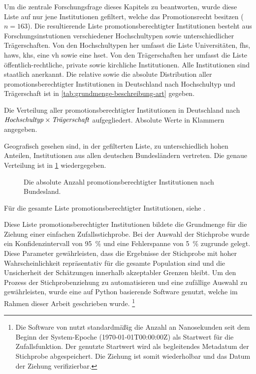 Um die zentrale Forschungsfrage dieses Kapitels zu beantworten, wurde diese Liste auf nur jene Institutionen gefiltert, welche das Promotionsrecht besitzen ($n=163$).
Die resultierende Liste promotionsberechtigter Institutionen besteht aus Forschungsinstutionen verschiedener Hochschultypen sowie unterschiedlicher Trägerschaften.
Von den Hochschultypen her umfasst die Liste Universitäten, \glspl{fh}, \glspl{haw}, \glspl{kh}, eine \gls{vh} sowie eine \gls{hset}.
Von den Trägerschaften her umfasst die Liste öffentlich-rechtliche, private sowie kirchliche Institutionen. Alle Institutionen sind staatlich anerkannt.
Die relative sowie die absolute Distribution aller promotionsberechtigter Institutionen in Deutschland nach Hochschultyp und Trägerschaft ist in \cref{tab:grundmenge-beschreibung-art} gegeben.
\begin{table}[!htbp]
	\caption{Die Verteilung aller promotionsberechtigter Institutionen in Deutschland nach $\text{\textit{Hochschultyp}}\times\text{\textit{Trägerschaft}}$ aufgegliedert. Absolute Werte in Klammern angegeben.}
    
	\label{tab:grundmenge-beschreibung-art}
\end{table}

\noindent Geografisch gesehen sind, in der gefilterten Liste, zu unterschiedlich hohen Anteilen, Institutionen aus allen deutschen Bundesländern vertreten.
Die genaue Verteilung ist in \cref{fig:DE-grundmenge-beschreibung} wiedergegeben.
\begin{figure}[!htbp]
    \centering
    
    \caption{Die absolute Anzahl promotionsberechtigter Institutionen nach Bundesland.}
    \label{fig:DE-grundmenge-beschreibung}
\end{figure}

\noindent Für die gesamte Liste promotionsberechtigter Institutionen, siehe .

Diese Liste promotionsberechtigter Institutionen bildete die Grundmenge für die Ziehung einer einfachen Zufallsstichprobe.
Bei der Auswahl der Stichprobe wurde ein Konfidenzintervall von \SI{95}{\percent} und eine Fehlerspanne von \SI{5}{\percent} zugrunde gelegt.
Diese Parameter gewährleisten, dass die Ergebnisse der Stichprobe mit hoher Wahrscheinlichkeit repräsentativ für die gesamte Population sind und die Unsicherheit der Schätzungen innerhalb akzeptabler Grenzen bleibt.
Um den Prozess der Stichprobenziehung zu automatisieren und eine zufällige Auswahl zu gewährleisten, wurde eine auf Python basierende Software \autocite{Krassnig2024-csv} genutzt, welche im Rahmen dieser Arbeit geschrieben wurde.%
\footnote{%
Die Software von \citeauthor{Krassnig2024-csv} \autocite{Krassnig2024-csv} nutzt standardmäßig die Anzahl an Nanosekunden seit dem Beginn der System-Epoche (1970-01-01T00:00:00Z) als Startwert für die Zufallsfunktion.
Der genutzte Startwert wird als begleitendes Metadatum der Stichprobe abgespeichert.
Die Ziehung ist somit wiederholbar und das Datum der Ziehung verifizierbar.} 

